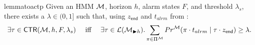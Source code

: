 \documentclass[runningheads]{llncs}
\newcommand{\sj}[2][]{\todo[color=red!50!white,#1]{\footnotesize{SJ: #2}}}
\newcommand{\lm}[2][]{\todo[color=cyan!50!white,#1]{\footnotesize{Luko: #2}}}
\newcommand{\talrm}{t_{alrm}}
\newcommand{\ig}{z_{\color{gray} ignore}\xspace}
\begin{document}
\begin{restatable}{lemma}{toactp}
    \label{lem:toactp}
    Given an HMM $\mathcal{M}$, horizon $h$, alarm states $F$, and threshold $\lambda_s$, there exists a $\lambda\in(0,1]$ such that, using $z_\mathsf{end}$ and $\talrm$ from :
    \[ \exists \tau \in \mathsf{CTR}(\mc, h, F, \lambda_s) \quad\text{ iff }\quad \exists \tau \in \lang{\mc_{\blacktriangleright h}}. \sum_{\pi\in\Pi^\mc}\Prob^\mc(\pi \cdot \talrm \mid \tau \cdot z_\mathsf{end}) \geq \lambda.\]
\end{restatable}
%
%
\end{document}
